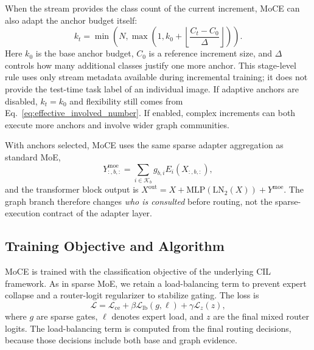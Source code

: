 \documentclass{article}
\theoremstyle{definition}
\theoremstyle{remark}
\begin{document}
When the stream provides the class count of the current increment, MoCE can also adapt the anchor budget itself:
\begin{equation}
    k_t=\min\left(N,\max\left(1,k_0+\left\lfloor\frac{C_t-C_0}{\Delta}\right\rfloor\right)\right).
    \label{eq:adaptive_k}
\end{equation}
Here $k_0$ is the base anchor budget, $C_0$ is a reference increment size, and $\Delta$ controls how many additional classes justify one more anchor. This stage-level rule uses only stream metadata available during incremental training; it does not provide the test-time task label of an individual image. If adaptive anchors are disabled, $k_t=k_0$ and flexibility still comes from Eq.~\eqref{eq:effective_involved_number}. If enabled, complex increments can both execute more anchors and involve wider graph communities.

With anchors selected, MoCE uses the same sparse adapter aggregation as standard MoE,
\begin{equation}
    Y^{\mathrm{moe}}_{:,b,:}=\sum_{i\in\mathcal{K}_b}g_{b,i}E_i(X_{:,b,:}),
    \label{eq:moce_output}
\end{equation}
and the transformer block output is $X^{\mathrm{out}}=X+\mathrm{MLP}(\mathrm{LN}_2(X))+Y^{\mathrm{moe}}$. The graph branch therefore changes \emph{who is consulted} before routing, not the sparse-execution contract of the adapter layer.

\subsection{Training Objective and Algorithm}
MoCE is trained with the classification objective of the underlying CIL framework. As in sparse MoE, we retain a load-balancing term to prevent expert collapse and a router-logit regularizer to stabilize gating. The loss is
\begin{equation}
    \mathcal{L}=\mathcal{L}_{\mathrm{ce}}+\beta\mathcal{L}_{\mathrm{lb}}(g,\ell)+\gamma\mathcal{L}_{z}(z),
    \label{eq:loss}
\end{equation}
where $g$ are sparse gates, $\ell$ denotes expert load, and $z$ are the final mixed router logits. The load-balancing term is computed from the final routing decisions, because those decisions include both base and graph evidence.
\end{document}
